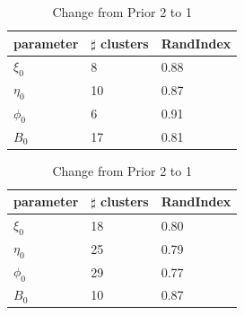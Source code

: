 \documentclass{article}
\begin{document}
\begin{spacing}{1.1}
\begin{center}
\begin{table}[t]
\begin{minipage}[b]{0.5\textwidth} 
\caption{Change from Prior 1 to 2}
\begin{tabular}{|l|l|l|}
\hline
{\bf parameter}  &{\bf $\sharp$ clusters}  &{\bf RandIndex} \\ 
\hline 
$\xi_{0}$  & 8 & 0.88 \\
\hline
$\eta_{0}$  & 10 & 0.87 \\
\hline
$\phi_{0}$  & 6 & 0.91 \\
\hline
$B_{0}$  & 17 & 0.81 \\

\hline
\end{tabular}
\end{minipage}
\begin{minipage}[b]{0.5\textwidth} 
\caption{Change from Prior 2 to 1}
\begin{tabular}{|l|l|l|}

\hline
{\bf parameter}  &{\bf $\sharp$ clusters}  &{\bf RandIndex} \\ 
\hline 
$\xi_{0}$  & 18 & 0.80 \\
\hline
$\eta_{0}$  & 25 & 0.79 \\
\hline
$\phi_{0}$  & 29 & 0.77 \\
\hline
$B_{0}$  & 10 & 0.87 \\
\hline
\end{tabular}
\end{minipage}


\end{table}
\end{center}
\end{spacing}
\end{document}
